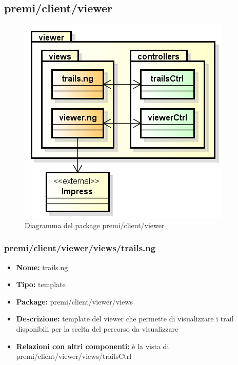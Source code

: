 \subsection{premi/client/viewer}
\begin{figure}[!h]
\begin{center}
\includegraphics[scale=0.45]{img/diapkg/viewer.png}
\caption{Diagramma del package premi/client/viewer}
\end{center}
\end{figure}
\subsubsection{premi/client/viewer/views/trails.ng}
\begin{itemize}
  \item[] \textbf{Nome:} trails.ng
  \item[] \textbf{Tipo:} template
  \item[] \textbf{Package:} premi/client/viewer/views
  \item[] \textbf{Descrizione:} template del viewer che permette di visualizzare i trail disponibili per la scelta del percorso da visualizzare
  \item[] \textbf{Relazioni con altri componenti:} è la vista di premi/client/viewer/views/trailsCtrl
\end{itemize}
